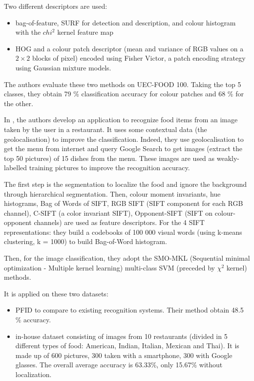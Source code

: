 Two different descriptors are used:
\begin{itemize}
    \item bag-of-feature, SURF for detection and description, and colour histogram with the $chi^2$ kernel feature map
    \item HOG and a colour patch descriptor (mean and variance of RGB values on a $2 \times 2$ blocks of pixel) encoded using Fisher Victor, a patch encoding strategy using Gaussian mixture models.
\end{itemize}
The authors evaluate these two methods on UEC-FOOD 100. Taking the top 5 classes, they obtain 79 \% classification accuracy for colour patches and 68 \% for the other.


In \cite{Bettadapura2015}, the authors develop an application to recognize food items from an image taken by the user in a restaurant. It uses some contextual data (the geolocalisation) to improve the classification. Indeed, they use geolocalisation to get the menu from internet and query Google Search to get images (extract the top 50 pictures) of 15 dishes from the menu. These images are used as weakly-labelled training pictures to improve the recognition accuracy.

The first step is the segmentation to localize the food and ignore the background through hierarchical segmentation. Then, colour moment invariants, hue histograms, Bag of Words of SIFT, RGB SIFT (SIFT component for each RGB channel), C-SIFT (a color invariant SIFT), Opponent-SIFT (SIFT on colour-opponent channels) are used as feature descriptors. For the 4 SIFT representations: they build a codebooks of 100 000 visual words (using k-means clustering, k = 1000) to build Bag-of-Word histogram.

Then, for the image classification, they adopt the SMO-MKL (Sequential minimal optimization - Multiple kernel learning) multi-class SVM (preceded by $\chi^2$ kernel) methods.

It is applied on these two datasets:
\begin{itemize}
    \item PFID to compare to existing recognition systems. Their method obtain 48.5 \% accuracy.
    
    \item in-house dataset consisting of images from 10 restaurants (divided in 5 different types of food: American, Indian, Italian, Mexican and Thai). It is made up of 600 pictures, 300 taken with a smartphone, 300 with Google glasses. The overall average accuracy is 63.33\%, only 15.67\% without localization.
\end{itemize}